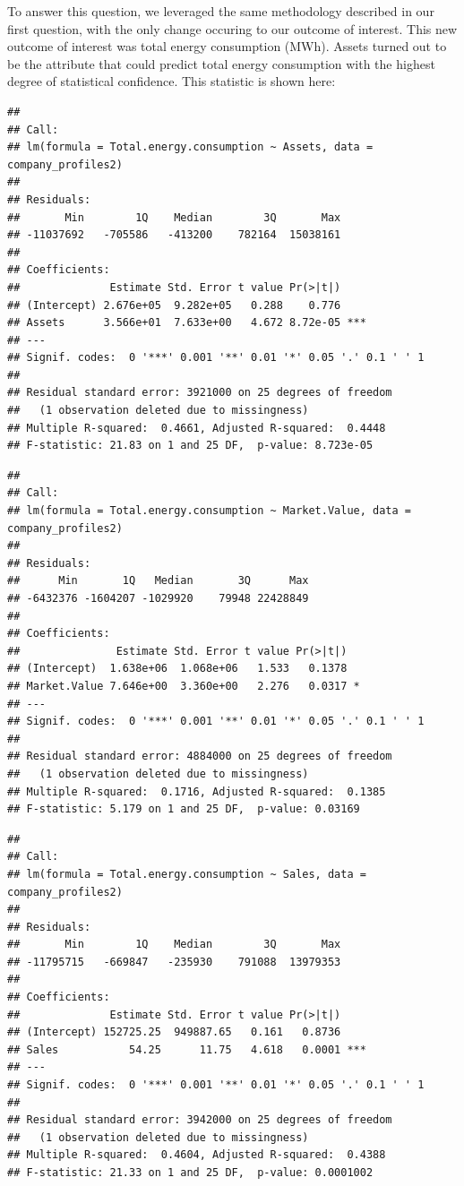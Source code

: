 \documentclass[
  12pt,
]{article}
\begin{document}
To answer this question, we leveraged the same methodology described in
our first question, with the only change occuring to our outcome of
interest. This new outcome of interest was total energy consumption
(MWh). Assets turned out to be the attribute that could predict total
energy consumption with the highest degree of statistical confidence.
This statistic is shown here:

\begin{verbatim}
## 
## Call:
## lm(formula = Total.energy.consumption ~ Assets, data = company_profiles2)
## 
## Residuals:
##       Min        1Q    Median        3Q       Max 
## -11037692   -705586   -413200    782164  15038161 
## 
## Coefficients:
##              Estimate Std. Error t value Pr(>|t|)    
## (Intercept) 2.676e+05  9.282e+05   0.288    0.776    
## Assets      3.566e+01  7.633e+00   4.672 8.72e-05 ***
## ---
## Signif. codes:  0 '***' 0.001 '**' 0.01 '*' 0.05 '.' 0.1 ' ' 1
## 
## Residual standard error: 3921000 on 25 degrees of freedom
##   (1 observation deleted due to missingness)
## Multiple R-squared:  0.4661, Adjusted R-squared:  0.4448 
## F-statistic: 21.83 on 1 and 25 DF,  p-value: 8.723e-05
\end{verbatim}

\begin{verbatim}
## 
## Call:
## lm(formula = Total.energy.consumption ~ Market.Value, data = company_profiles2)
## 
## Residuals:
##      Min       1Q   Median       3Q      Max 
## -6432376 -1604207 -1029920    79948 22428849 
## 
## Coefficients:
##               Estimate Std. Error t value Pr(>|t|)  
## (Intercept)  1.638e+06  1.068e+06   1.533   0.1378  
## Market.Value 7.646e+00  3.360e+00   2.276   0.0317 *
## ---
## Signif. codes:  0 '***' 0.001 '**' 0.01 '*' 0.05 '.' 0.1 ' ' 1
## 
## Residual standard error: 4884000 on 25 degrees of freedom
##   (1 observation deleted due to missingness)
## Multiple R-squared:  0.1716, Adjusted R-squared:  0.1385 
## F-statistic: 5.179 on 1 and 25 DF,  p-value: 0.03169
\end{verbatim}

\begin{verbatim}
## 
## Call:
## lm(formula = Total.energy.consumption ~ Sales, data = company_profiles2)
## 
## Residuals:
##       Min        1Q    Median        3Q       Max 
## -11795715   -669847   -235930    791088  13979353 
## 
## Coefficients:
##              Estimate Std. Error t value Pr(>|t|)    
## (Intercept) 152725.25  949887.65   0.161   0.8736    
## Sales           54.25      11.75   4.618   0.0001 ***
## ---
## Signif. codes:  0 '***' 0.001 '**' 0.01 '*' 0.05 '.' 0.1 ' ' 1
## 
## Residual standard error: 3942000 on 25 degrees of freedom
##   (1 observation deleted due to missingness)
## Multiple R-squared:  0.4604, Adjusted R-squared:  0.4388 
## F-statistic: 21.33 on 1 and 25 DF,  p-value: 0.0001002
\end{verbatim}
\end{document}
